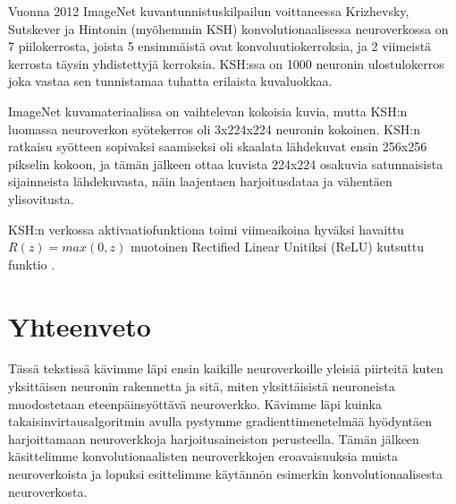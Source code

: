 \documentclass[finnish]{tktltiki2}
\theoremstyle{definition}
\theoremstyle{remark}
\begin{document}
    Vuonna 2012 ImageNet kuvantunnistuskilpailun voittaneessa Krizhevsky, Sutskever ja Hintonin (myöhemmin KSH) konvolutionaalisessa neuroverkossa on 7 piilokerrosta, joista 5 ensimmäistä ovat konvoluutiokerroksia, ja 2 viimeistä kerrosta täysin yhdistettyjä kerroksia. KSH:ssa on 1000 neuronin ulostulokerros joka vastaa sen tunnistamaa tuhatta erilaista kuvaluokkaa.
    
    ImageNet kuvamateriaalissa on vaihtelevan kokoisia kuvia, mutta KSH:n luomassa neuroverkon syötekerros oli 3x224x224 neuronin kokoinen. KSH:n ratkaisu syötteen sopivaksi saamiseksi oli skaalata lähdekuvat ensin 256x256 pikselin kokoon, ja tämän jälkeen ottaa kuvista 224x224 osakuvia satunnaisista sijainneista lähdekuvasta, näin laajentaen harjoitusdataa ja vähentäen ylisovitusta.
    
    KSH:n verkossa aktivaatiofunktiona toimi viimeaikoina hyväksi havaittu $R(z) = max(0, z)$ muotoinen Rectified Linear Unitiksi (ReLU) kutsuttu funktio \cite{KSHimagenet2012}.

\section{Yhteenveto} 

Tässä tekstissä kävimme läpi ensin kaikille neuroverkoille yleisiä piirteitä kuten yksittäisen neuronin rakennetta ja sitä, miten yksittäisistä neuroneista muodostetaan eteenpäinsyöttävä neuroverkko. Kävimme läpi kuinka takaisinvirtausalgoritmin avulla pystymme gradienttimenetelmää hyödyntäen harjoittamaan neuroverkkoja harjoitusaineiston perusteella. Tämän jälkeen käsittelimme konvolutionaalisten neuroverkkojen eroavaisuuksia muista neuroverkoista ja lopuksi esittelimme käytännön esimerkin konvolutionaalisesta neuroverkosta.








  \nocite{*}
  
  





  
\end{document}
